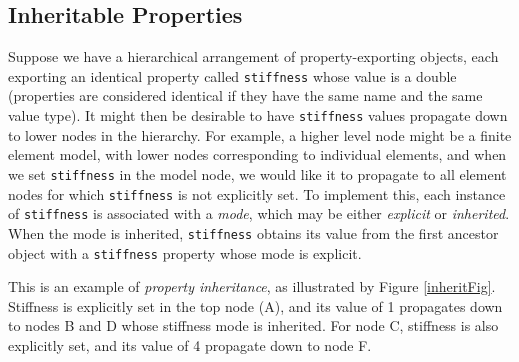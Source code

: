 \documentclass{article}
\begin{document}
\subsection{Inheritable Properties}

Suppose we have a hierarchical arrangement of property-exporting
objects, each exporting an identical property called {\tt stiffness}
whose value is a double (properties are considered identical if they
have the same name and the same value type). It might then be
desirable to have {\tt stiffness} values propagate down to lower nodes
in the hierarchy. For example, a higher level node might be a finite
element model, with lower nodes corresponding to individual elements,
and when we set {\tt stiffness} in the model node, we would like it to
propagate to all element nodes for which {\tt stiffness} is not
explicitly set. To implement this, each instance of {\tt stiffness} is
associated with a {\it mode}, which may be either {\it explicit} or
{\it inherited}. When the mode is inherited, {\tt stiffness} obtains
its value from the first ancestor object with a {\tt stiffness}
property whose mode is explicit.

This is an example of {\it property inheritance}, as illustrated by
Figure \ref{inheritFig}. Stiffness is explicitly set in the top node
(A), and its value of 1 propagates down to nodes B and D whose
stiffness mode is inherited. For node C, stiffness is also explicitly
set, and its value of 4 propagate down to node F.
\end{document}
